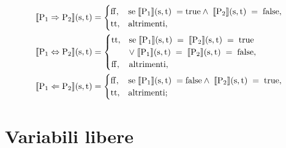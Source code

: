 \documentclass[a4paper, 12pt, oneside,fleqn]{book}
\begin{document}
\begin{align}
\llbracket \mathrm{P}{_1} \Rightarrow \mathrm{P}{_2}\rrbracket(\mathrm{s},\mathrm{t}) &=
	\begin{cases}
   		\mathrm{ff}, &\text{se} \hspace{1mm}\llbracket \mathrm{P}{_1}\rrbracket(\mathrm{s},\mathrm{t})\hspace{1mm} = \mathrm{true} \wedge \hspace{1mm}					\llbracket \mathrm{P}{_2}\rrbracket(\mathrm{s},\mathrm{t})\hspace{1mm} = \hspace{1mm}\mathrm{false},   \\
   		\mathrm{tt},	&\text{altrimenti},
	\end{cases} \\
\llbracket \mathrm{P}{_1} \Leftrightarrow \mathrm{P}{_2}\rrbracket(\mathrm{s},\mathrm{t}) &= 
	\begin{cases}
   		\mathrm{tt},&\text{se} \hspace{1mm}\llbracket \mathrm{P}{_1}\rrbracket(\mathrm{s},\mathrm{t})\hspace{1mm} = \hspace{1mm}\llbracket 						\mathrm{P}{_2}\rrbracket(\mathrm{s},\mathrm{t})\hspace{1mm} = \hspace{1mm}\mathrm{true} \\ 
   		 	&\vee\hspace{1mm}\llbracket \mathrm{P}{_1}\rrbracket(\mathrm{s},\mathrm{t})\hspace{1mm} = \hspace{1mm}\llbracket \mathrm{P}{_2}							\rrbracket(\mathrm{s},\mathrm{t})\hspace{1mm} = \hspace{1mm}\mathrm{false},  \\
   	   \mathrm{ff},&\text{altrimenti},
	\end{cases} \\
\llbracket \mathrm{P}{_1} \Leftarrow \mathrm{P}{_2}\rrbracket(\mathrm{s},\mathrm{t}) &= 
	\begin{cases}
   		\mathrm{ff},&\text{se} \hspace{1mm}\llbracket \mathrm{P}{_1}\rrbracket(\mathrm{s},\mathrm{t})\hspace{1mm} = \mathrm{false} \wedge \hspace{1mm}					\llbracket \mathrm{P}{_2}\rrbracket(\mathrm{s},\mathrm{t})\hspace{1mm} = \hspace{1mm}\mathrm{true},   \\
   		\mathrm{tt},&\text{altrimenti};
   \end{cases} 
\end{align}
\chapter{Variabili libere}
\end{document}

